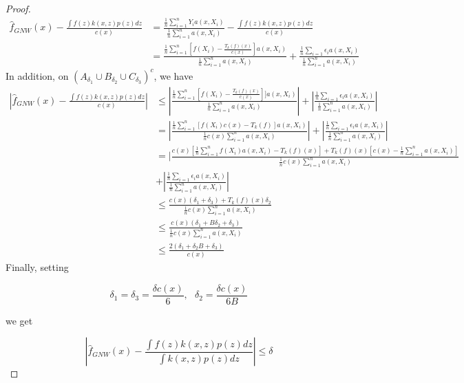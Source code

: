 \documentclass{article}
\begin{document}
\begin{proof}
\begin{equation}
\label{eqn:Equation_1}
\begin{split}
    \hat{f}_{GNW}(x)-\frac{\int f(z)k(x,z)p(z)dz}{c(x)}&=\frac{\frac{1}{n}\sum_{i=1}^nY_ia(x,X_i)}{\frac{1}{n}\sum_{i=1}^n a(x,X_i)}-\frac{\int f(z)k(x,z)p(z)dz}{c(x)}\\
    &=\frac{\frac{1}{n}\sum_{i=1}^n[f(X_i)-\frac{T_k(f)(x)}{c(x)}]a(x,X_i)}{\frac{1}{n}\sum_{i=1}^n a(x,X_i)}+\frac{\frac{1}{n}\sum_{i=1}\epsilon_ia(x,X_i)}{\frac{1}{n}\sum_{i=1}^n a(x,X_i)}
\end{split}
\end{equation}
In addition, on $(A_{\delta_1}\cup B_{\delta_2}\cup C_{\delta_3})^c$, we have
\begin{equation*}
\begin{split}
    |\hat{f}_{GNW}(x)-\frac{\int f(z)k(x,z)p(z)dz}{c(x)}|&\leq |\frac{\frac{1}{n}\sum_{i=1}^n[f(X_i)-\frac{T_k(f)(x)}{c(x)}]]a(x,X_i)}{\frac{1}{n}\sum_{i=1}^n a(x,X_i)}|+|\frac{\frac{1}{n}\sum_{i=1}\epsilon_ia(x,X_i)}{\frac{1}{n}\sum_{i=1}^n a(x,X_i)}|\\
    &= |\frac{\frac{1}{n}\sum_{i=1}^n [f(X_i)c(x)-T_k(f)]a(x,X_i)}{\frac{1}{n}c(x)\sum_{i=1}^na(x,X_i)}|+|\frac{\frac{1}{n}\sum_{i=1}\epsilon_ia(x,X_i)}{\frac{1}{n}\sum_{i=1}^n a(x,X_i)}|\\
    & = |\frac{c(x)[\frac{1}{n}\sum_{i=1}^nf(X_i)a(x,X_i)-T_k(f)(x)]+T_k(f)(x)[c(x)-\frac{1}{n}\sum_{i=1}^n a(x,X_i)]
    }{\frac{1}{n}c(x)\sum_{i=1}^na(x,X_i)}\\
    &+|\frac{\frac{1}{n}\sum_{i=1}\epsilon_ia(x,X_i)}{\frac{1}{n}\sum_{i=1}^n a(x,X_i)}|\\
    & \leq  \frac{c(x)(\delta_1+\delta_3)+T_k(f)(x)\delta_2}{\frac{1}{n}c(x)\sum_{i=1}^n a(x,X_i)}\\
    & \leq \frac{c(x)(\delta_1+B\delta_2+\delta_3)}{\frac{1}{n}c(x)\sum_{i=1}^n a(x,X_i)}\\
    & \leq \frac{2(\delta_1+\delta_2B+\delta_3)}{c(x)}
\end{split}
\end{equation*}
Finally, setting

\begin{equation*}
\delta_1=\delta_3=\frac{\delta c(x)}{6}, \textit{ } \delta_2=\frac{\delta c(x)}{6B}
\end{equation*}

we get 

\begin{equation*}
     |\hat{f}_{GNW}(x)-\frac{\int f(z)k(x,z)p(z)dz}{\int k(x,z)p(z)dz}|\leq \delta
\end{equation*}


\end{proof}
\end{document}
